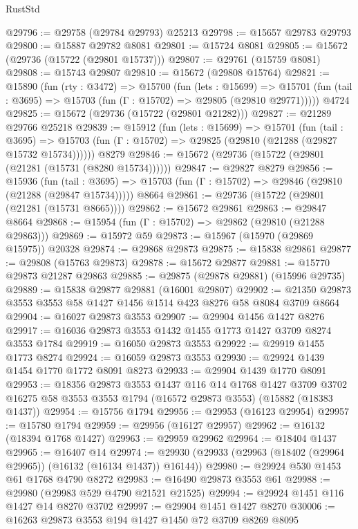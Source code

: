 \begin{lexlean}{RustStd}
\begin{coremodule}
@29796 := @29758 (@29784 @29793) @25213
@29798 := @15657 @29783 @29793
@29800 := @15887 @29782 @8081
@29801 := @15724 @8081
@29805 := @15672 (@29736 (@15722 (@29801 @15737)))
@29807 := @29761 (@15759 @8081)
@29808 := @15743 @29807
@29810 := @15672 (@29808 @15764)
@29821 := @15890
    (fun (rty : @3472) =>
    @15700
      (fun (lets : @15699) =>
      @15701 (fun (tail : @3695) => @15703 (fun (Γ : @15702) => @29805 (@29810 @29771)))))
    @4724
@29825 := @15672 (@29736 (@15722 (@29801 @21282)))
@29827 := @21289 @29766 @25218
@29839 := @15912
    (fun (lets : @15699) =>
    @15701
      (fun (tail : @3695) =>
      @15703 (fun (Γ : @15702) => @29825 (@29810 (@21288 (@29827 @15732 @15734))))))
    @8279
@29846 := @15672 (@29736 (@15722 (@29801 (@21281 (@15731 (@8280 @15734))))))
@29847 := @29827 @8279
@29856 := @15936
    (fun (tail : @3695) => @15703 (fun (Γ : @15702) => @29846 (@29810 (@21288 (@29847 @15734)))))
    @8664
@29861 := @29736 (@15722 (@29801 (@21281 (@15731 @8665))))
@29862 := @15672 @29861
@29863 := @29847 @8664
@29868 := @15954 (fun (Γ : @15702) => @29862 (@29810 (@21288 @29863)))
@29869 := @15972 @59
@29873 := @15967 (@15970 (@29869 @15975)) @20328
@29874 := @29868 @29873
@29875 := @15838 @29861
@29877 := @29808 (@15763 @29873)
@29878 := @15672 @29877
@29881 := @15770 @29873 @21287 @29863
@29885 := @29875 (@29878 @29881) (@15996 @29735)
@29889 := @15838 @29877 @29881 (@16001 @29807)
@29902 := @21350 @29873 @3553 @3553 @58 @1427 @1456 @1514 @423 @8276 @58 @8084 @3709 @8664
@29904 := @16027 @29873 @3553
@29907 := @29904 @1456 @1427 @8276
@29917 := @16036 @29873 @3553 @1432 @1455 @1773 @1427 @3709 @8274 @3553 @1784
@29919 := @16050 @29873 @3553
@29922 := @29919 @1455 @1773 @8274
@29924 := @16059 @29873 @3553
@29930 := @29924 @1439 @1454 @1770 @1772 @8091 @8273
@29933 := @29904 @1439 @1770 @8091
@29953 := @18356
    @29873
    @3553
    @1437
    @116
    @14
    @1768
    @1427
    @3709
    @3702
    @16275
    @58
    @3553
    @3553
    @1794
    (@16572 @29873 @3553)
    (@15882 (@18383 @1437))
@29954 := @15756 @1794
@29956 := @29953 (@16123 @29954)
@29957 := @15780 @1794
@29959 := @29956 (@16127 @29957)
@29962 := @16132 (@18394 @1768 @1427)
@29963 := @29959 @29962
@29964 := @18404 @1437
@29965 := @16407 @14
@29974 := @29930 (@29933 (@29963 (@18402 (@29964 @29965)) (@16132 (@16134 @1437)) @16144))
@29980 := @29924 @530 @1453 @61 @1768 @4790 @8272
@29983 := @16490 @29873 @3553 @61
@29988 := @29980 (@29983 @529 @4790 @21521 @21525)
@29994 := @29924 @1451 @116 @1427 @14 @8270 @3702
@29997 := @29904 @1451 @1427 @8270
@30006 := @16263 @29873 @3553 @194 @1427 @1450 @72 @3709 @8269 @8095

\end{coremodule}
\end{lexlean}
